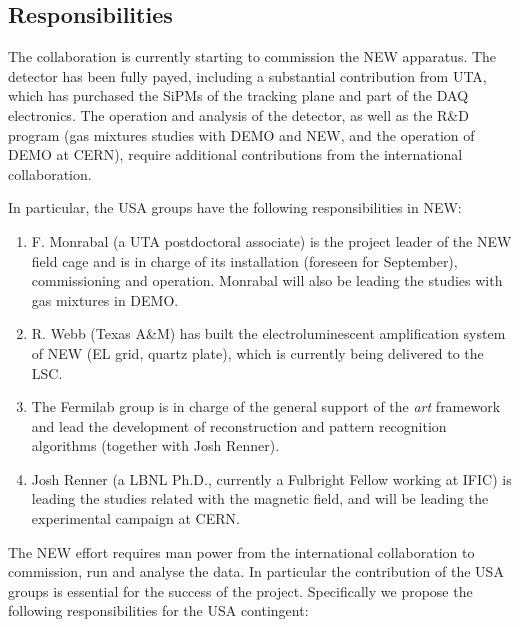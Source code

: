 \subsection{Responsibilities}

The collaboration is currently starting to commission the NEW apparatus. The detector has been fully payed, including a substantial contribution from UTA, which has purchased the SiPMs of the tracking plane and part of the DAQ electronics. The operation and analysis of the detector, as well as the R\&D program (gas mixtures studies with DEMO and NEW, and the operation of DEMO at CERN), require additional contributions from the international collaboration. 

In particular, the USA groups have the following responsibilities in NEW:

\begin{enumerate}
\item F. Monrabal (a UTA postdoctoral associate) is the project leader of the NEW field cage and is in charge of its installation (foreseen for September), commissioning and operation. Monrabal will also be leading the studies with gas mixtures in DEMO.
\item R. Webb (Texas A\&M) has built the electroluminescent amplification system of NEW (EL grid, quartz plate), which is currently being delivered to the LSC. 
\item The Fermilab group is in charge of the general support of the {\em art} framework and lead the development of reconstruction and pattern recognition algorithms (together with Josh Renner).
\item Josh Renner (a LBNL Ph.D., currently a Fulbright Fellow working at IFIC) is leading the studies related with the magnetic field, and will be leading the experimental campaign at CERN.
\end{enumerate}

The NEW effort requires man power from the international collaboration to commission, run and analyse the data.
In particular the contribution of the USA groups is essential for the success of the project. Specifically we propose the following responsibilities for the USA contingent:


